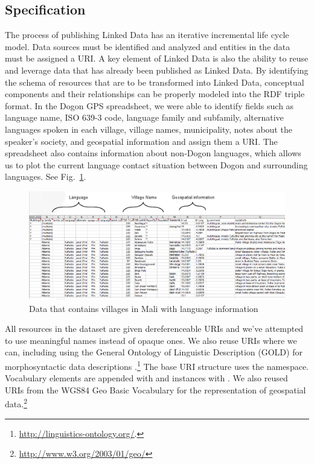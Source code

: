 \subsection{Specification}
The process of publishing Linked Data has an iterative incremental life cycle model. Data sources must be identified and analyzed and entities in the data must be assigned a URI. A key element of Linked Data is also the ability to reuse and leverage data that has already been published as Linked Data. By identifying the schema of resources that are to be transformed into Linked Data, conceptual components and their relationships can be properly modeled into the RDF triple format. In the Dogon GPS spreadsheet, we were able to identify fields such as language name, ISO 639-3 code, language family and subfamily, alternative languages spoken in each village, village names, municipality, notes about the speaker's society, and geospatial information and assign them a URI. The spreadsheet also contains information about non-Dogon languages, which allows us to plot the current language contact situation between Dogon and surrounding languages. See Fig.\ \ref{spreadsheet}.

\begin{figure}[b!hpt]
\caption{Data that contains villages in Mali with language information}\label{spreadsheet}
\includegraphics[width=15cm]{img/spreadsheet.png}
\end{figure}

All resources in the dataset are given dereferenceable URIs and we've attempted to use meaningful names instead of opaque ones. We also reuse URIs where we can, including using the General Ontology of Linguistic Description (GOLD) for morphosyntactic data descriptions \cite{farrar2003linguistic}.\footnote{ \url{http://linguistics-ontology.org/}.} The base URI structure uses the  namespace. Vocabulary elements are appended with  and instances with . We also reused URIs from the WGS84 Geo Basic Vocabulary for the representation of geospatial data.\footnote{\url{http://www.w3.org/2003/01/geo/}} 

